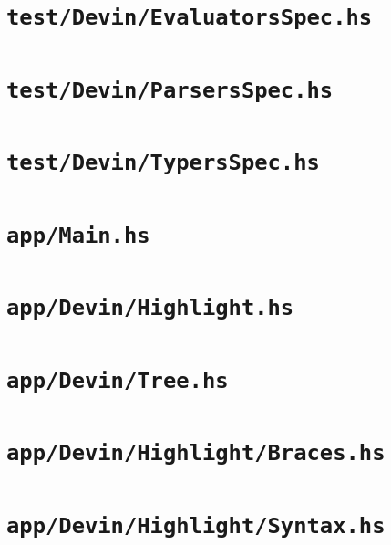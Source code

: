\documentclass[UdineBachThesis,american,11pt]{PhdThesis}
\begin{document}
  

  \section{\texttt{test/Devin/EvaluatorsSpec.hs}}

  

  \section{\texttt{test/Devin/ParsersSpec.hs}}

  

  \section{\texttt{test/Devin/TypersSpec.hs}}

  

  \section{\texttt{app/Main.hs}}
  \label{section:appmainhs}

  

  \section{\texttt{app/Devin/Highlight.hs}}

  

  \section{\texttt{app/Devin/Tree.hs}}

  

  \section{\texttt{app/Devin/Highlight/Braces.hs}}

  

  \section{\texttt{app/Devin/Highlight/Syntax.hs}}

  

  \printbibliography[heading=bibintoc]
\end{document}
